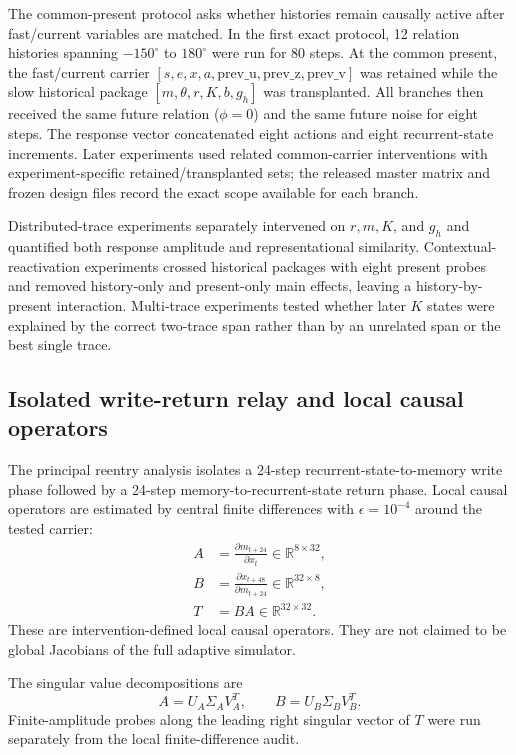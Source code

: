 \documentclass[aps,pre,preprint,superscriptaddress,nofootinbib]{revtex4-2}
\begin{document}
The common-present protocol asks whether histories remain causally active after fast/current variables are matched. In the first exact protocol, 12 relation histories spanning $-150^\circ$ to $180^\circ$ were run for 80 steps. At the common present, the fast/current carrier $[s,e,x,a,\mathrm{prev\_u},\mathrm{prev\_z},\mathrm{prev\_v}]$ was retained while the slow historical package $[m,\theta,r,K,b,g_h]$ was transplanted. All branches then received the same future relation ($\phi=0$) and the same future noise for eight steps. The response vector concatenated eight actions and eight recurrent-state increments. Later experiments used related common-carrier interventions with experiment-specific retained/transplanted sets; the released master matrix and frozen design files record the exact scope available for each branch.

Distributed-trace experiments separately intervened on $r,m,K$, and $g_h$ and quantified both response amplitude and representational similarity. Contextual-reactivation experiments crossed historical packages with eight present probes and removed history-only and present-only main effects, leaving a history-by-present interaction. Multi-trace experiments tested whether later $K$ states were explained by the correct two-trace span rather than by an unrelated span or the best single trace.

\subsection{Isolated write-return relay and local causal operators}

The principal reentry analysis isolates a 24-step recurrent-state-to-memory write phase followed by a 24-step memory-to-recurrent-state return phase. Local causal operators are estimated by central finite differences with $\epsilon=10^{-4}$ around the tested carrier:
\begin{align}
 A &= \frac{\partial m_{t+24}}{\partial x_t}\in\mathbb{R}^{8\times32},\\
 B &= \frac{\partial x_{t+48}}{\partial m_{t+24}}\in\mathbb{R}^{32\times8},\\
 T &= BA\in\mathbb{R}^{32\times32}.
\end{align}
These are intervention-defined local causal operators. They are not claimed to be global Jacobians of the full adaptive simulator.

The singular value decompositions are
\begin{equation}
 A=U_A\Sigma_AV_A^T,\qquad B=U_B\Sigma_BV_B^T.
\end{equation}
Finite-amplitude probes along the leading right singular vector of $T$ were run separately from the local finite-difference audit.
\end{document}
